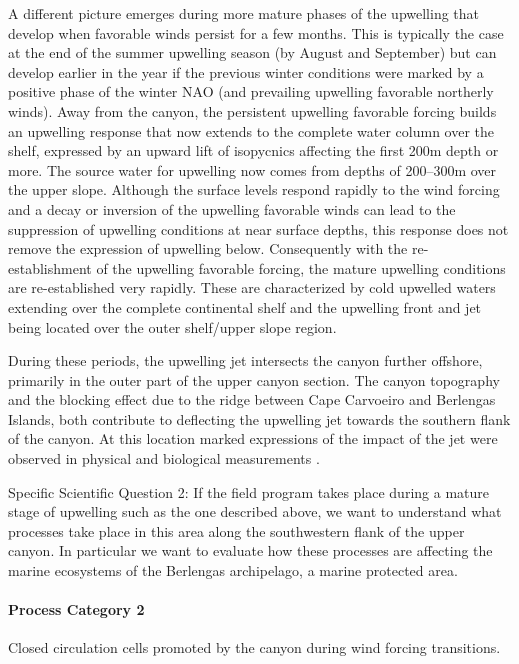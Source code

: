 A different picture emerges during more mature phases of the upwelling
that develop when favorable winds persist for a few months. This is
typically the case at the end of the summer upwelling season (by
August and September) but can develop earlier in the year if the
previous winter conditions were marked by a positive phase of the
winter NAO (and prevailing upwelling favorable northerly winds). Away
from the canyon, the persistent upwelling favorable forcing builds an
upwelling response that now extends to the complete water column over
the shelf, expressed by an upward lift of isopycnics affecting the
first 200m depth or more. The source water for upwelling now comes
from depths of 200--300m over the upper slope. Although the surface
levels respond rapidly to the wind forcing and a decay or inversion of
the upwelling favorable winds can lead to the suppression of upwelling
conditions at near surface depths, this response does not remove the
expression of upwelling below. Consequently with the re-establishment
of the upwelling favorable forcing, the mature upwelling conditions
are re-established very rapidly. These are characterized by cold
upwelled waters extending over the complete continental shelf and the
upwelling front and jet being located over the outer shelf/upper slope
region.

During these periods, the upwelling jet intersects the \naz canyon
further offshore, primarily in the outer part of the upper canyon
section. The canyon topography and the blocking effect due to the
ridge between Cape Carvoeiro and Berlengas Islands, both contribute to
deflecting the upwelling jet towards the southern flank of the
canyon. At this location marked expressions of the impact of the jet
were observed in physical and biological measurements .

 
\textsf{Specific Scientific Question 2:} If the \proj field program
takes place during a mature stage of upwelling such as the one
described above, we want to understand what processes take place in
this area along the southwestern flank of the upper \naz canyon. In
particular we want to evaluate how these processes are affecting the
marine ecosystems of the Berlengas archipelago, a marine protected
area.

\par

\paragraph{Process Category 2} Closed circulation cells promoted by
the canyon during wind forcing transitions.


